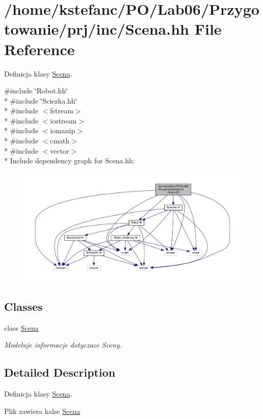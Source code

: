 \hypertarget{_scena_8hh}{\section{/home/kstefanc/\+P\+O/\+Lab06/\+Przygotowanie/prj/inc/\+Scena.hh File Reference}
\label{_scena_8hh}
}


Definicja klasy \hyperlink{class_scena}{Scena}.  


{\ttfamily \#include \char`\"{}Robot.\+hh\char`\"{}}\\*
{\ttfamily \#include \char`\"{}Sciezka.\+hh\char`\"{}}\\*
{\ttfamily \#include $<$fstream$>$}\\*
{\ttfamily \#include $<$iostream$>$}\\*
{\ttfamily \#include $<$iomanip$>$}\\*
{\ttfamily \#include $<$cmath$>$}\\*
{\ttfamily \#include $<$vector$>$}\\*
Include dependency graph for Scena.\+hh\+:
\nopagebreak
\begin{figure}[H]
\begin{center}
\leavevmode
\includegraphics[width=350pt]{_scena_8hh__incl}
\end{center}
\end{figure}
\subsection*{Classes}
\begin{DoxyCompactItemize}
\item 
class \hyperlink{class_scena}{Scena}
\begin{DoxyCompactList}\small\item\em Modeluje informacje dotyczace Sceny. \end{DoxyCompactList}\end{DoxyCompactItemize}


\subsection{Detailed Description}
Definicja klasy \hyperlink{class_scena}{Scena}. 

Plik zawiera kalse \hyperlink{class_scena}{Scena} 